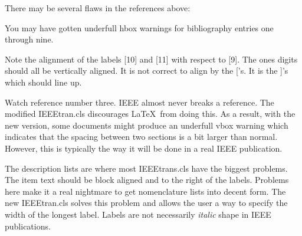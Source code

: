 \documentclass[10pt,twocolumn]{IEEEtran}
\begin{document}
There may be several flaws in the references above:
\begin{description}
\item[First:] You may have gotten underfull hbox warnings
for bibliography entries one through nine.
\item[Second:] Note the alignment of the labels [10] and [11] with
respect to [9]. The ones digits should all be vertically aligned.
It is not correct to align by the ['s. It is the ]'s which should line
up.
\item[Lastly:] Watch reference number three. IEEE almost never breaks a
reference. The modified IEEEtran.cls discourages \LaTeX\ from doing this.
As a result, with the new version, some documents might produce an underfull
vbox warning which indicates that the spacing between two sections is a
bit larger than normal. However, this is typically the way it will be done in a real IEEE
publication.
\end{description}




The description lists are where most IEEEtrans.cls have the biggest
problems. The item text should be block aligned and to the right of the
labels. Problems here make it a real nightmare to get nomenclature lists 
into decent form. The new IEEEtran.cls solves this problem and allows the 
user a way to specify the width of the longest label.
Labels are not necessarily \textit{italic} shape in IEEE publications.
\end{document}
